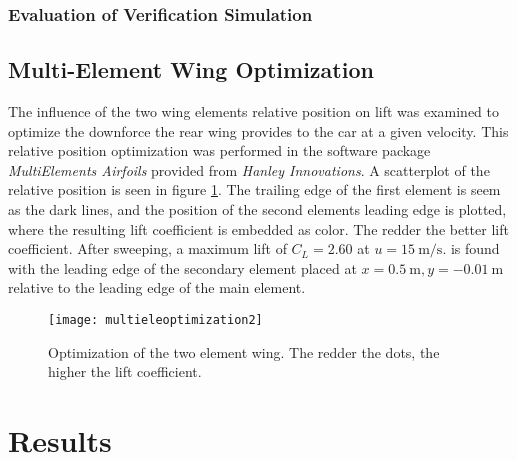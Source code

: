   \subsubsection{Evaluation of Verification Simulation}

  \subsection{Multi-Element Wing Optimization}
  The influence of the two wing elements relative position on lift was examined to optimize the downforce the rear wing provides to the car at a given velocity. This relative position optimization was performed in the software package \emph{MultiElements Airfoils} provided from \emph{Hanley Innovations}. A scatterplot of the relative position is seen in figure \ref{fig:multieleoptimization}. The trailing edge of the first element is seem as the dark lines, and the position of the second elements leading edge is plotted, where the resulting lift coefficient is embedded as color. The redder the better lift coefficient. After sweeping, a maximum lift of $C_L = 2.60$  at $u = \SI{15}{\metre\per\second}$. is found with the leading edge of the secondary element placed at $x=\SI{0.5}{\metre},y=\SI{-0.01}{\metre}$ relative to the leading edge of the main element.

  \begin{figure}
    \texttt{[image: multieleoptimization2]}
    \label{fig:multieleoptimization}
    \caption{Optimization of the two element wing. The redder the dots, the higher the lift coefficient.}
  \end{figure}

\section{Results}
